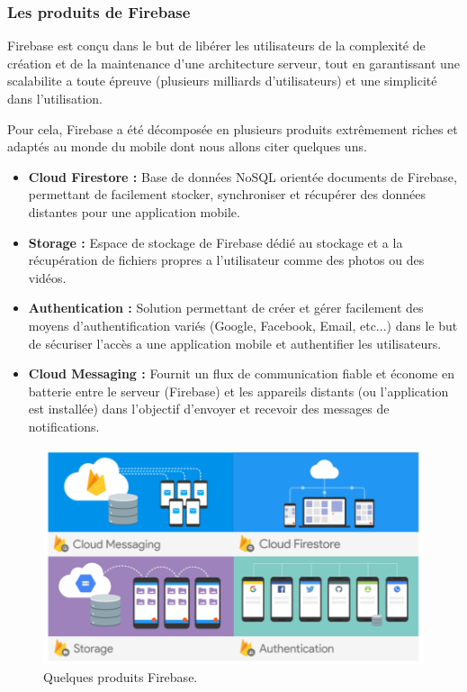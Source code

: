 \subsubsection{Les produits de Firebase}

Firebase est conçu dans le but de libérer les utilisateurs de la complexité de création et de la maintenance d'une architecture serveur, tout en garantissant une scalabilite a toute épreuve (plusieurs milliards d'utilisateurs) et une simplicité dans l'utilisation. 

Pour cela, Firebase a été décomposée en plusieurs produits extrêmement riches et
adaptés au monde du mobile dont nous allons citer quelques uns.

\begin{itemize}

\item \textbf{Cloud Firestore :} Base de données NoSQL orientée documents de Firebase, permettant de facilement stocker, synchroniser et récupérer des données distantes pour une application mobile.

\item \textbf{Storage :} Espace de stockage de Firebase dédié au stockage et a la récupération de fichiers propres a l'utilisateur comme des photos ou des vidéos.

\item \textbf{Authentication :} Solution permettant de créer et gérer facilement des moyens d'authentification variés (Google, Facebook, Email, etc...) dans le but de sécuriser l'accès a une application mobile et authentifier les utilisateurs.

\item \textbf{Cloud Messaging :} Fournit un flux de communication fiable et économe en batterie entre le serveur (Firebase) et les appareils distants (ou l'application est installée) dans l'objectif d'envoyer et recevoir des messages de notifications.

\end{itemize}

\begin{figure}[h]
	\centering
    \includegraphics[scale=0.6]{img/part2/3.2}
    \caption{Quelques produits Firebase.}
\end{figure}